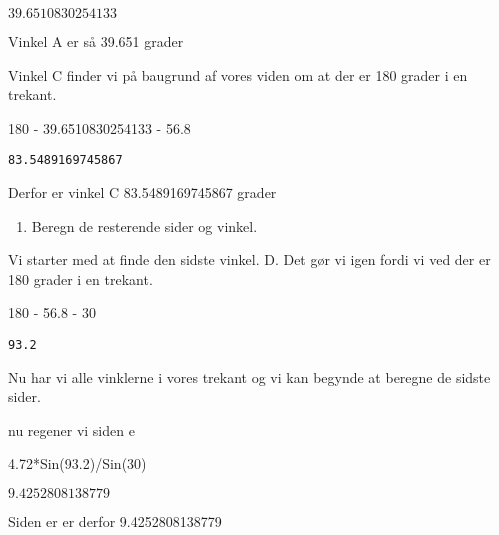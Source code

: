 \documentclass[
  a4paper,
]{article}
\newenvironment{Shaded}{\begin{snugshade}}{\end{snugshade}}
\newcommand{\DecValTok}[1]{\textcolor[rgb]{0.68,0.00,0.00}{#1}}
\newcommand{\FloatTok}[1]{\textcolor[rgb]{0.68,0.00,0.00}{#1}}
\newcommand{\NormalTok}[1]{\textcolor[rgb]{0.00,0.23,0.31}{#1}}
\newcommand{\OperatorTok}[1]{\textcolor[rgb]{0.37,0.37,0.37}{#1}}
\providecommand{\tightlist}{%
  \setlength{\itemsep}{0pt}\setlength{\parskip}{0pt}}\usepackage{longtable,booktabs,array}
\begin{document}
$\displaystyle 39.6510830254133$

Vinkel A er så 39.651 grader

Vinkel C finder vi på baugrund af vores viden om at der er 180 grader i
en trekant.

\begin{Shaded}
\begin{Highlighting}[]
\DecValTok{180} \OperatorTok{{-}} \FloatTok{39.6510830254133} \OperatorTok{{-}} \FloatTok{56.8}
\end{Highlighting}
\end{Shaded}

\begin{verbatim}
83.5489169745867
\end{verbatim}

Derfor er vinkel C 83.5489169745867 grader

\begin{enumerate}
\def\labelenumi{\arabic{enumi}.}
\setcounter{enumi}{1}
\tightlist
\item
  Beregn de resterende sider og vinkel.
\end{enumerate}

Vi starter med at finde den sidste vinkel. D. Det gør vi igen fordi vi
ved der er 180 grader i en trekant.

\begin{Shaded}
\begin{Highlighting}[]
\DecValTok{180} \OperatorTok{{-}} \FloatTok{56.8} \OperatorTok{{-}} \DecValTok{30}
\end{Highlighting}
\end{Shaded}

\begin{verbatim}
93.2
\end{verbatim}

Nu har vi alle vinklerne i vores trekant og vi kan begynde at beregne de
sidste sider.

nu regener vi siden e

\begin{Shaded}
\begin{Highlighting}[]
\FloatTok{4.72}\OperatorTok{*}\NormalTok{Sin(}\FloatTok{93.2}\NormalTok{)}\OperatorTok{/}\NormalTok{Sin(}\DecValTok{30}\NormalTok{)}
\end{Highlighting}
\end{Shaded}

$\displaystyle 9.4252808138779$

Siden er er derfor 9.4252808138779
\end{document}
